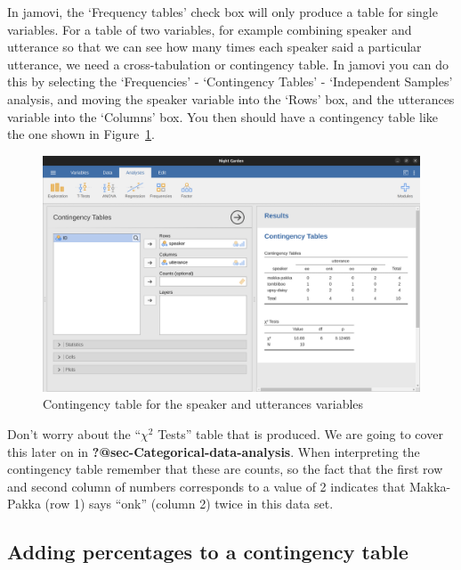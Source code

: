\documentclass[
  a4paper,
]{book}
\begin{document}
In jamovi, the `Frequency tables' check box will only produce a table
for single variables. For a table of two variables, for example
combining speaker and utterance so that we can see how many times each
speaker said a particular utterance, we need a cross-tabulation or
contingency table. In jamovi you can do this by selecting the
`Frequencies' - `Contingency Tables' - `Independent Samples' analysis,
and moving the speaker variable into the `Rows' box, and the utterances
variable into the `Columns' box. You then should have a contingency
table like the one shown in Figure~\ref{fig-fig6-1}.

\begin{figure}

\includegraphics[width=1\textwidth,height=\textheight]{images/fig6-1.png} \hfill{}

\caption{\label{fig-fig6-1}Contingency table for the speaker and
utterances variables}

\end{figure}

Don't worry about the ``\(\chi^2\) Tests'' table that is produced. We
are going to cover this later on in
\textbf{?@sec-Categorical-data-analysis}. When interpreting the
contingency table remember that these are counts, so the fact that the
first row and second column of numbers corresponds to a value of 2
indicates that Makka-Pakka (row 1) says ``onk'' (column 2) twice in this
data set.

\hypertarget{adding-percentages-to-a-contingency-table}{%
\subsection{Adding percentages to a contingency
table}\label{adding-percentages-to-a-contingency-table}}
\end{document}
